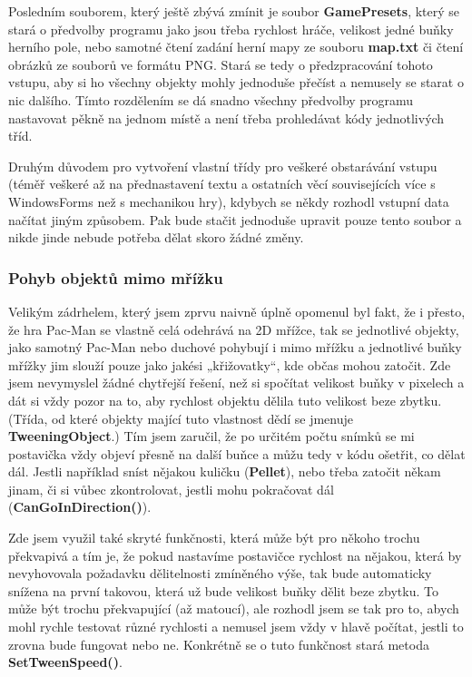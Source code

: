 \documentclass[a4]{article}
\begin{document}
Posledním souborem, který ještě zbývá zmínit je soubor \textbf{GamePresets}, který se stará o předvolby programu jako jsou třeba rychlost hráče, velikost jedné buňky herního pole, nebo samotné čtení zadání herní mapy ze souboru \textbf{map.txt} či čtení obrázků ze souborů ve formátu PNG. Stará se tedy o předzpracování tohoto vstupu, aby si ho všechny objekty mohly jednoduše přečíst a nemusely se starat o nic dalšího. Tímto rozdělením se dá snadno všechny předvolby programu nastavovat pěkně na jednom místě a není třeba prohledávat kódy jednotlivých tříd.

Druhým důvodem pro vytvoření vlastní třídy pro veškeré obstarávání vstupu (téměř veškeré až na přednastavení textu a ostatních věcí souvisejících více s WindowsForms než s mechanikou hry), kdybych se někdy rozhodl vstupní data načítat jiným způsobem. Pak bude stačit jednoduše upravit pouze tento soubor a nikde jinde nebude potřeba dělat skoro žádné změny.

\subsubsection{Pohyb objektů mimo mřížku} \label{tweening}
Velikým zádrhelem, který jsem zprvu naivně úplně opomenul byl fakt, že i přesto, že hra Pac-Man se vlastně celá odehrává na 2D mřížce, tak se jednotlivé objekty, jako samotný Pac-Man nebo duchové pohybují i mimo mřížku a jednotlivé buňky mřížky jim slouží pouze jako jakési „křižovatky“, kde občas mohou zatočit. Zde jsem nevymyslel žádné chytřejší řešení, než si spočítat velikost buňky v pixelech a dát si vždy pozor na to, aby rychlost objektu dělila tuto velikost beze zbytku. (Třída, od které objekty mající tuto vlastnost dědí se jmenuje \textbf{TweeningObject}.) Tím jsem zaručil, že po určitém počtu snímků se mi postavička vždy objeví přesně na další buňce a můžu tedy v kódu ošetřit, co dělat dál. Jestli například sníst nějakou kuličku (\textbf{Pellet}), nebo třeba zatočit někam jinam, či si vůbec zkontrolovat, jestli mohu pokračovat dál (\textbf{CanGoInDirection()}).

Zde jsem využil také skryté funkčnosti, která může být pro někoho trochu překvapivá a tím je, že pokud nastavíme postavičce rychlost na nějakou, která by nevyhovovala požadavku dělitelnosti zmíněného výše, tak bude automaticky snížena na první takovou, která už bude velikost buňky dělit beze zbytku. To může být trochu překvapující (až matoucí), ale rozhodl jsem se tak pro to, abych mohl rychle testovat různé rychlosti a nemusel jsem vždy v hlavě počítat, jestli to zrovna bude fungovat nebo ne. Konkrétně se o tuto funkčnost stará metoda \textbf{SetTweenSpeed()}. 
\end{document}
